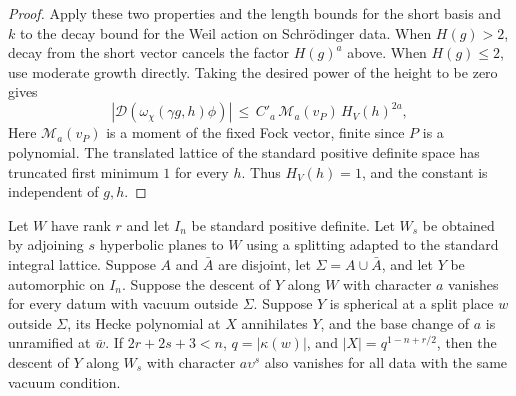 \begin{proof}
Apply these two properties and the length bounds for the short basis and $k$ to the decay bound for the Weil action on Schrödinger data. When $H(g)>2$, decay from the short vector cancels the factor $H(g)^a$ above. When $H(g)\le2$, use moderate growth directly. Taking the desired power of the height to be zero gives
\[
 |\mathcal D(\omega_\chi(\gamma g,h)\phi)|
      \,\le\, C'_a\,\mathcal M_a(v_P)\,H_V(h)^{2a},
\]
Here $\mathcal M_a(v_P)$ is a moment of the fixed Fock vector, finite since $P$ is a polynomial. The translated lattice of the standard positive definite space has truncated first minimum $1$ for every $h$. Thus $H_V(h)=1$, and the constant is independent of $g,h$.
\end{proof}

\begin{lemma}
\label{lem:c-false-tower-step}
\emitthmsource
Let $W$ have rank $r$ and let $I_n$ be standard positive definite. Let $W_s$ be obtained by adjoining $s$ hyperbolic planes to $W$ using a splitting adapted to the standard integral lattice. Suppose $A$ and $\bar A$ are disjoint, let $\Sigma=A\cup\bar A$, and let $Y$ be automorphic on $I_n$. Suppose the descent of $Y$ along $W$ with character $a$ vanishes for every datum with vacuum outside $\Sigma$. Suppose $Y$ is spherical at a split place $w$ outside $\Sigma$, its Hecke polynomial at $X$ annihilates $Y$, and the base change of $a$ is unramified at $\bar w$. If $2r+2s+3<n$, $q=|\kappa(w)|$, and $|X|=q^{1-n+r/2}$, then the descent of $Y$ along $W_s$ with character $a\upsilon^s$ also vanishes for all data with the same vacuum condition.
\end{lemma}

